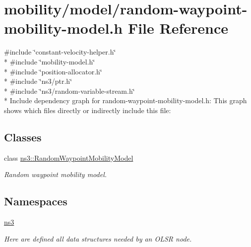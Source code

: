 \hypertarget{random-waypoint-mobility-model_8h}{}\section{mobility/model/random-\/waypoint-\/mobility-\/model.h File Reference}
\label{random-waypoint-mobility-model_8h}
{\ttfamily \#include \char`\"{}constant-\/velocity-\/helper.\+h\char`\"{}}\\*
{\ttfamily \#include \char`\"{}mobility-\/model.\+h\char`\"{}}\\*
{\ttfamily \#include \char`\"{}position-\/allocator.\+h\char`\"{}}\\*
{\ttfamily \#include \char`\"{}ns3/ptr.\+h\char`\"{}}\\*
{\ttfamily \#include \char`\"{}ns3/random-\/variable-\/stream.\+h\char`\"{}}\\*
Include dependency graph for random-\/waypoint-\/mobility-\/model.h\+:
This graph shows which files directly or indirectly include this file\+:
\subsection*{Classes}
\begin{DoxyCompactItemize}
\item 
class \hyperlink{classns3_1_1RandomWaypointMobilityModel}{ns3\+::\+Random\+Waypoint\+Mobility\+Model}
\begin{DoxyCompactList}\small\item\em Random waypoint mobility model. \end{DoxyCompactList}\end{DoxyCompactItemize}
\subsection*{Namespaces}
\begin{DoxyCompactItemize}
\item 
 \hyperlink{namespacens3}{ns3}
\begin{DoxyCompactList}\small\item\em Here are defined all data structures needed by an O\+L\+SR node. \end{DoxyCompactList}\end{DoxyCompactItemize}
